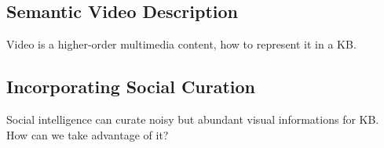 \subsection{Semantic Video Description}
Video is a higher-order multimedia content, how to represent it in a KB.
\subsection{Incorporating Social Curation}
Social intelligence can curate noisy but abundant visual informations for KB. How can we take advantage of it?




{\scriptsize{}}




